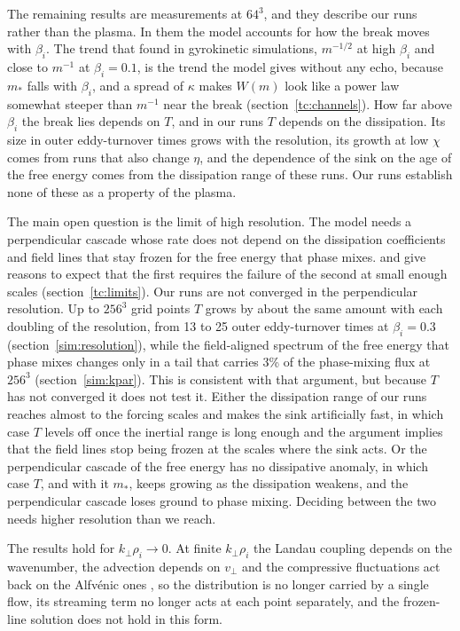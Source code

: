 The remaining results are measurements at $64^3$, and they describe our runs rather than the plasma. In them the model accounts for how the break moves with $\beta_i$. The trend that \citet{Kawazura2019,Kawazura2020} found in gyrokinetic simulations, $m^{-1/2}$ at high $\beta_i$ and close to $m^{-1}$ at $\beta_i=0.1$, is the trend the model gives without any echo, because $m_*$ falls with $\beta_i$, and a spread of $\kappa$ makes $W(m)$ look like a power law somewhat steeper than $m^{-1}$ near the break (section~\ref{tc:channels}). How far above $\beta_i$ the break lies depends on $T$, and in our runs $T$ depends on the dissipation. Its size in outer eddy-turnover times grows with the resolution, its growth at low $\chi$ comes from runs that also change $\eta$, and the dependence of the sink on the age of the free energy comes from the dissipation range of these runs. Our runs establish none of these as a property of the plasma.

The main open question is the limit of high resolution. The model needs a perpendicular cascade whose rate does not depend on the dissipation coefficients and field lines that stay frozen for the free energy that phase mixes. \citet{DrivasEyink2017} and \citet{Eyink2018} give reasons to expect that the first requires the failure of the second at small enough scales (section~\ref{tc:limits}). Our runs are not converged in the perpendicular resolution. Up to $256^3$ grid points $T$ grows by about the same amount with each doubling of the resolution, from 13 to 25 outer eddy-turnover times at $\beta_i=0.3$ (section~\ref{sim:resolution}), while the field-aligned spectrum of the free energy that phase mixes changes only in a tail that carries 3\% of the phase-mixing flux at $256^3$ (section~\ref{sim:kpar}). This is consistent with that argument, but because $T$ has not converged it does not test it. Either the dissipation range of our runs reaches almost to the forcing scales and makes the sink artificially fast, in which case $T$ levels off once the inertial range is long enough and the argument implies that the field lines stop being frozen at the scales where the sink acts. Or the perpendicular cascade of the free energy has no dissipative anomaly, in which case $T$, and with it $m_*$, keeps growing as the dissipation weakens, and the perpendicular cascade loses ground to phase mixing. Deciding between the two needs higher resolution than we reach.

The results hold for $k_\perp\rho_i\to0$. At finite $k_\perp\rho_i$ the Landau coupling depends on the wavenumber, the advection depends on $v_\perp$ and the compressive fluctuations act back on the Alfv\'enic ones \citep{Chandran2026}, so the distribution is no longer carried by a single flow, its streaming term no longer acts at each point separately, and the frozen-line solution does not hold in this form.

